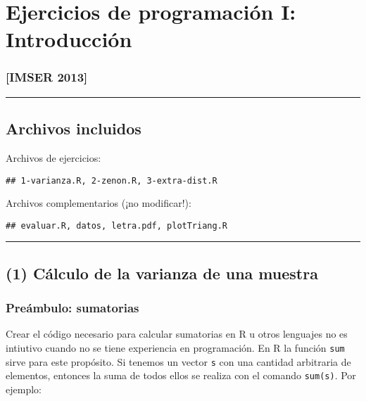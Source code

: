 \documentclass[]{article}
\begin{document}
\section{Ejercicios de programación I: Introducción}

\subsubsection{{[}IMSER 2013{]}}

\begin{center}\rule{3in}{0.4pt}\end{center}

\subsection{Archivos incluidos}

Archivos de ejercicios:

\begin{verbatim}
## 1-varianza.R, 2-zenon.R, 3-extra-dist.R
\end{verbatim}
Archivos complementarios (¡no modificar!):

\begin{verbatim}
## evaluar.R, datos, letra.pdf, plotTriang.R
\end{verbatim}
\begin{center}\rule{3in}{0.4pt}\end{center}

\subsection{(1) Cálculo de la varianza de una muestra}

\subsubsection{Preámbulo: sumatorias}

Crear el código necesario para calcular sumatorias en R u otros
lenguajes no es intiutivo cuando no se tiene experiencia en
programación. En R la función \texttt{sum} sirve para este propósito. Si
tenemos un vector \texttt{s} con una cantidad arbitraria de elementos,
entonces la suma de todos ellos se realiza con el comando
\texttt{sum(s)}. Por ejemplo:
\end{document}
